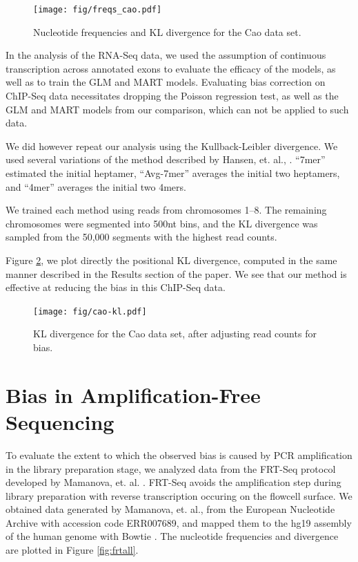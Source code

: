 \documentclass[letterpaper]{article}
\begin{document}
\begin{figure}[H]
\begin{center}
\texttt{[image: fig/freqs\_cao.pdf]}
\end{center}
\caption{Nucleotide frequencies and KL divergence for the Cao data set.}
\label{fig:freqscao}
\end{figure}

In the analysis of the RNA-Seq data, we used the assumption of continuous
transcription across annotated exons to evaluate the efficacy of the models, as
well as to train the GLM and MART models. Evaluating bias correction on ChIP-Seq
data necessitates dropping the Poisson regression test, as well as the GLM and
MART models from our comparison, which can not be applied to such data.

We did however repeat our analysis using the Kullback-Leibler divergence.
We used several variations of the method described by Hansen, et. al.,
\cite{Hansen2010}. ``7mer'' estimated the initial heptamer, ``Avg-7mer''
averages the initial two heptamers, and ``4mer'' averages the initial two 4mers.

We trained each method using reads from chromosomes 1--8. The
remaining chromosomes were segmented into 500nt bins, and the KL divergence was
sampled from the 50,000 segments with the highest read counts.

Figure \ref{fig:caokl}, we plot directly the positional KL divergence, computed
in the same manner described in the Results section of the paper.  We see that
our method is effective at reducing the bias in this ChIP-Seq data.

\begin{figure}[H]
\begin{center}
\texttt{[image: fig/cao-kl.pdf]}
\end{center}
\caption{KL divergence for the Cao data set, after adjusting read counts for
bias.}
\label{fig:caokl}
\end{figure}




\section{Bias in Amplification-Free Sequencing}

To evaluate the extent to which the observed bias is caused by PCR amplification
in the library preparation stage, we analyzed data from the FRT-Seq protocol
developed by Mamanova, et. al. \cite{Mamanova2010}. FRT-Seq avoids the
amplification step during library preparation with reverse transcription
occuring on the flowcell surface. We obtained data generated by Mamanova, et.
al., from the European Nucleotide Archive with accession code ERR007689, and
mapped them to the hg19 assembly of the human genome with Bowtie
\cite{Langmead2009}. The nucleotide frequencies and divergence are plotted
in Figure \ref{fig:frtall}.
\end{document}
